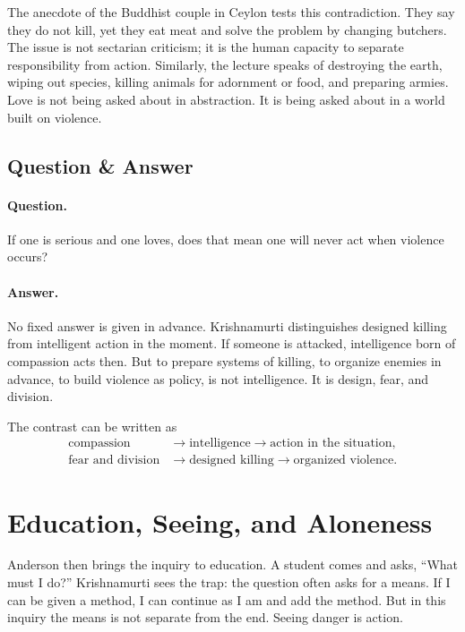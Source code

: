 The anecdote of the Buddhist couple in Ceylon tests this contradiction. They say they do not kill, yet they eat meat and solve the problem by changing butchers. The issue is not sectarian criticism; it is the human capacity to separate responsibility from action. Similarly, the lecture speaks of destroying the earth, wiping out species, killing animals for adornment or food, and preparing armies. Love is not being asked about in abstraction. It is being asked about in a world built on violence.

\subsection{Question \& Answer}

\paragraph{Question.}
If one is serious and one loves, does that mean one will never act when violence occurs?

\paragraph{Answer.}
No fixed answer is given in advance. Krishnamurti distinguishes designed killing from intelligent action in the moment. If someone is attacked, intelligence born of compassion acts then. But to prepare systems of killing, to organize enemies in advance, to build violence as policy, is not intelligence. It is design, fear, and division.

The contrast can be written as
\begin{align}
\text{compassion} &\longrightarrow \text{intelligence} \longrightarrow \text{action in the situation},\\
\text{fear and division} &\longrightarrow \text{designed killing} \longrightarrow \text{organized violence}.
\end{align}

\section{Education, Seeing, and Aloneness}

Anderson then brings the inquiry to education. A student comes and asks, ``What must I do?'' Krishnamurti sees the trap: the question often asks for a means. If I can be given a method, I can continue as I am and add the method. But in this inquiry the means is not separate from the end. Seeing danger is action.

